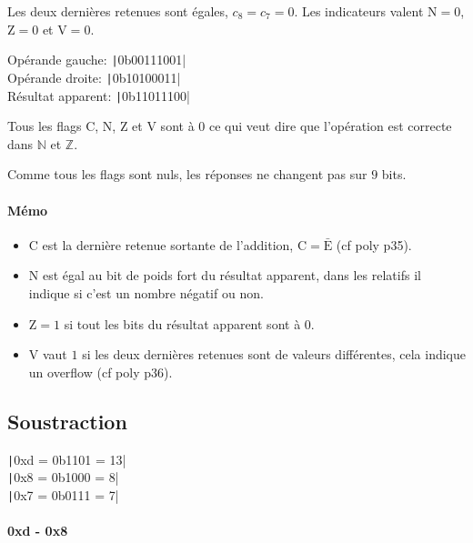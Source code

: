 \documentclass[french, 12pt, a4paper]{article}
\begin{document}
Les deux dernières retenues sont égales, $c_8 = c_7 = 0$. Les indicateurs valent $\mathrm{N} = 0$, $\mathrm{Z} = 0$ et $\mathrm{V} = 0$.

Opérande gauche: \texttt|0b00111001|		\\
Opérande droite: \texttt|0b10100011|		\\
Résultat apparent: \texttt|0b11011100|

Tous les flags $\mathrm{C}$, $\mathrm{N}$, $\mathrm{Z}$ et $\mathrm{V}$ sont à $0$ ce qui veut dire que l'opération est correcte dans $\mathbb{N}$ et $\mathbb{Z}$.

Comme tous les flags sont nuls, les réponses ne changent pas sur $9$ bits.

\paragraph{Mémo}

\begin{itemize}
	\item $\mathrm{C}$ est la dernière retenue sortante de l'addition, $\mathrm{C} = \mathrm{\bar{E}}$ (cf poly p35).
	\item $\mathrm{N}$ est égal au bit de poids fort du résultat apparent, dans les relatifs il indique si c'est un nombre négatif ou non.
	\item $\mathrm{Z} = 1$ si tout les bits du résultat apparent sont à $0$.
	\item $\mathrm{V}$ vaut $1$ si les deux dernières retenues sont de valeurs différentes, cela indique un overflow (cf poly p36).
\end{itemize}



\subsection{Soustraction}

\texttt|0xd = 0b1101 = 13|	\\
\texttt|0x8 = 0b1000 = 8|	\\
\texttt|0x7 = 0b0111 = 7|

\paragraph{0xd - 0x8}
\end{document}

